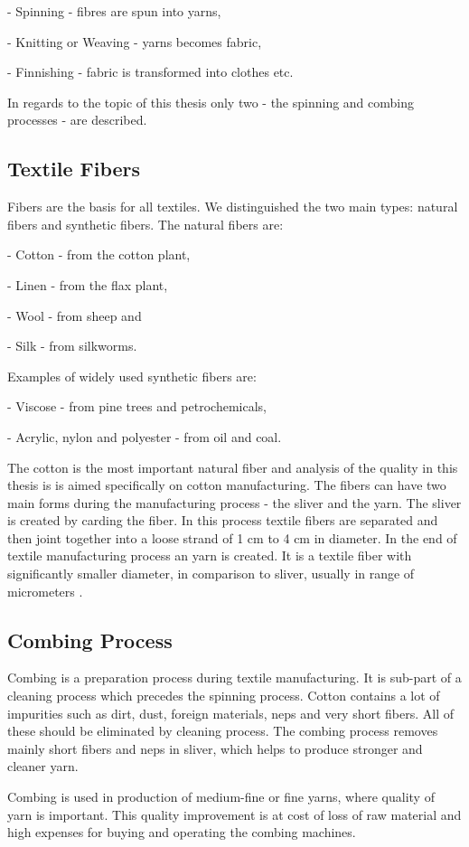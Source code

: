 \documentclass[twoside]{ctuthesis}
\theoremstyle{plain}
\theoremstyle{definition}
\theoremstyle{note}
\begin{document}
- Spinning - fibres are spun into yarns,

- Knitting or Weaving - yarns becomes fabric,

- Finnishing - fabric is transformed into clothes etc.

In regards to the topic of this thesis only two - the spinning and combing processes - are described.
\subsection{Textile Fibers}
Fibers are the basis for all textiles. We distinguished the two main types: natural fibers and synthetic fibers. The natural fibers are:

- Cotton - from the cotton plant,

- Linen - from the flax plant,

- Wool - from sheep and

- Silk - from silkworms.

Examples of widely used synthetic fibers are:

- Viscose - from pine trees and petrochemicals,

- Acrylic, nylon and polyester - from oil and coal. 

The cotton is the most important natural fiber and analysis of the quality in this thesis is is aimed specifically on cotton manufacturing. 
The fibers can have two main forms during the manufacturing process - the sliver and the yarn. The sliver is created by carding the fiber. In this process textile fibers are separated and then joint together into a loose strand of 1 cm to 4 cm in diameter. In the end of textile manufacturing process an yarn is created. It is a textile fiber with significantly smaller diameter, in comparison to sliver, usually in range of micrometers \cite{cite:FoFF}. 
\subsection{Combing Process}
Combing is a preparation process during textile manufacturing. It is sub-part of a cleaning process which precedes the spinning process. Cotton contains a lot of impurities such as dirt, dust, foreign materials, neps and very short fibers. All of these should be eliminated by cleaning process. The combing process removes mainly short fibers and neps in sliver, which helps to produce stronger and cleaner yarn.

Combing is used in production of medium-fine or fine yarns, where quality of yarn is important. This quality improvement is at cost of loss of raw material and high expenses for buying and operating the combing machines. 
\end{document}
